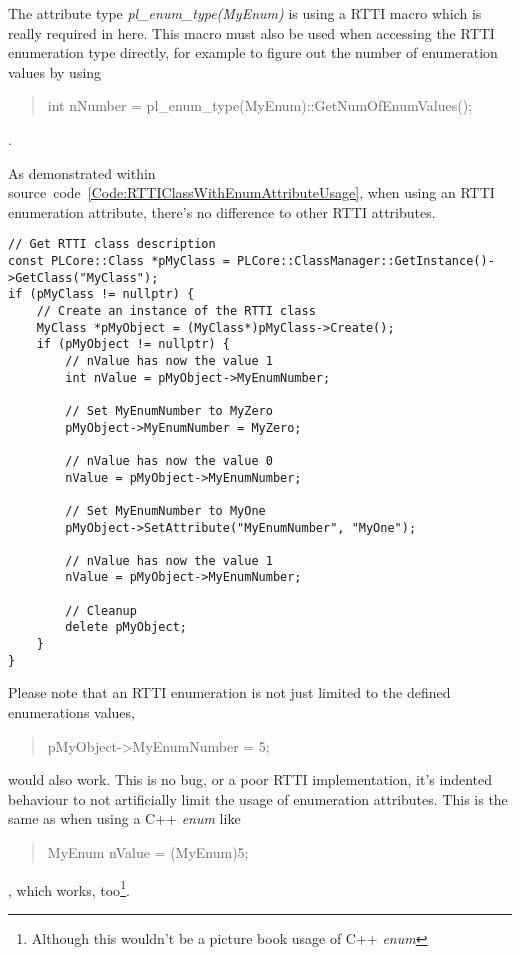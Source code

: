 The attribute type \emph{pl\_enum\_type(MyEnum)} is using a \ac{RTTI} macro which is really required in here. This macro must also be used when accessing the \ac{RTTI} enumeration type directly, for example to figure out the number of enumeration values by using \begin{quote}int nNumber = pl\_enum\_type(MyEnum)::GetNumOfEnumValues();\end{quote}.

As demonstrated within source~code~\ref{Code:RTTIClassWithEnumAttributeUsage}, when using an \ac{RTTI} enumeration attribute, there's no difference to other \ac{RTTI} attributes.
\begin{lstlisting}[label=Code:RTTIClassWithEnumAttributeUsage,caption={Using a \ac{RTTI} class with an enumeration attribute}]
// Get RTTI class description
const PLCore::Class *pMyClass = PLCore::ClassManager::GetInstance()->GetClass("MyClass");
if (pMyClass != nullptr) {
	// Create an instance of the RTTI class
	MyClass *pMyObject = (MyClass*)pMyClass->Create();
	if (pMyObject != nullptr) {
		// nValue has now the value 1
		int nValue = pMyObject->MyEnumNumber;

		// Set MyEnumNumber to MyZero
		pMyObject->MyEnumNumber = MyZero;

		// nValue has now the value 0
		nValue = pMyObject->MyEnumNumber;

		// Set MyEnumNumber to MyOne
		pMyObject->SetAttribute("MyEnumNumber", "MyOne");

		// nValue has now the value 1
		nValue = pMyObject->MyEnumNumber;

		// Cleanup
		delete pMyObject;
	}
}
\end{lstlisting}
Please note that an \ac{RTTI} enumeration is not just limited to the defined enumerations values, \begin{quote}pMyObject->MyEnumNumber = 5;\end{quote} would also work. This is no bug, or a poor \ac{RTTI} implementation, it's indented behaviour to not artificially limit the usage of enumeration attributes. This is the same as when using a C++ \emph{enum} like \begin{quote}MyEnum nValue = (MyEnum)5;\end{quote}, which works, too\footnote{Although this wouldn't be a picture book usage of C++ \emph{enum}}.


